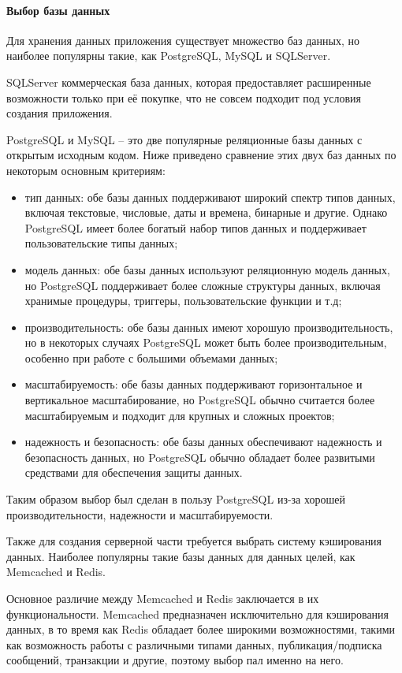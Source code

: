 \paragraph{Выбор базы данных}

Для хранения данных приложения существует множество баз данных,
но наиболее популярны такие, как PostgreSQL, MySQL и SQLServer.

SQLServer коммерческая база данных, которая предоставляет
расширенные возможности только при её покупке, что не совсем подходит под
условия создания приложения.

PostgreSQL и MySQL – это две популярные реляционные базы данных с
открытым исходным кодом. Ниже приведено сравнение этих двух баз данных
по некоторым основным критериям:
\begin{itemize}
	\item тип данных: обе базы данных поддерживают широкий спектр
	      типов данных, включая текстовые, числовые, даты и времена, бинарные и
	      другие. Однако PostgreSQL имеет более богатый набор типов данных и
	      поддерживает пользовательские типы данных;

	\item модель данных: обе базы данных используют реляционную
	      модель данных, но PostgreSQL поддерживает более сложные структуры
	      данных, включая хранимые процедуры, триггеры, пользовательские функции
	      и т.д;

	\item производительность: обе базы данных имеют хорошую
	      производительность, но в некоторых случаях PostgreSQL может быть более
	      производительным, особенно при работе с большими объемами данных;

	\item масштабируемость: обе базы данных поддерживают
	      горизонтальное и вертикальное масштабирование, но PostgreSQL обычно
	      считается более масштабируемым и подходит для крупных и сложных
	      проектов;

	\item надежность и безопасность: обе базы данных обеспечивают
	      надежность и безопасность данных, но PostgreSQL обычно обладает более
	      развитыми средствами для обеспечения защиты данных.
\end{itemize}

Таким образом выбор был сделан в пользу PostgreSQL из-за хорошей
производительности, надежности и масштабируемости.

Также для создания серверной части требуется выбрать систему
кэширования данных. Наиболее популярны такие базы данных для данных
целей, как Memcached и Redis.

Основное различие между Memcached и Redis заключается в их
функциональности. Memcached предназначен исключительно для
кэширования данных, в то время как Redis обладает более широкими
возможностями, такими как возможность работы с различными типами
данных, публикация/подписка сообщений, транзакции и другие, поэтому
выбор пал именно на него.
